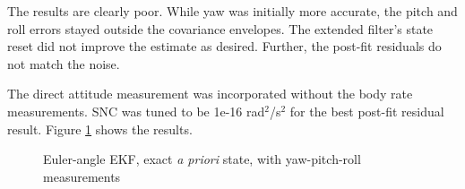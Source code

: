\documentclass[]{aiaa-tc}%
\begin{document}
The results are clearly poor. While yaw was initially more accurate, the pitch and roll errors stayed outside the covariance envelopes. The extended filter's state reset did not improve the estimate as desired. Further, the post-fit residuals do not match the noise.

	\vspace{5 mm}

The direct attitude measurement was incorporated without the body rate measurements. SNC was tuned to be 1e-16 rad$^2$/s$^2$ for the best post-fit residual result. Figure \ref{fig:ResultsEulerAPExact_ypr} shows the results.
	\begin{figure}[H]
		\centering
		\caption{Euler-angle EKF, exact \textit{a priori} state, with yaw-pitch-roll measurements }
		\label{fig:ResultsEulerAPExact_ypr}
	\end{figure}	
\end{document}
